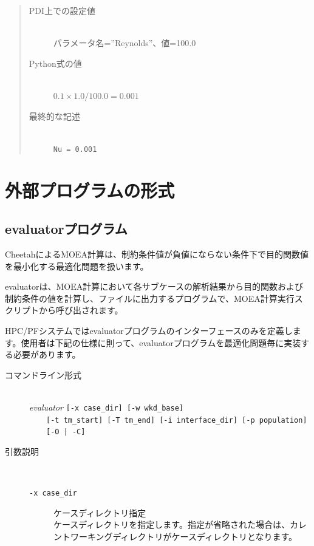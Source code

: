 \documentclass[a4paper,11pt]{jarticle}
\begin{document}
{\begin{quote}
\begin{description}
\item[PDI上での設定値] {\ }\\
パラメータ名=''Reynolds''、値=100.0

\item[Python式の値]  {\ }\\
$0.1 \times 1.0 \slash 100.0 = 0.001$

\item[最終的な記述]  {\ }\\
{\tt Nu = 0.001}
\end{description}
\end{quote}


\newpage
\section{外部プログラムの形式}

\subsection{evaluatorプログラム}

CheetahによるMOEA計算は、制約条件値が負値にならない条件下で目的関数値を最小化する最適化問題を扱います。

evaluatorは、MOEA計算において各サブケースの解析結果から目的関数および制約条件の値を計算し、ファイルに出力するプログラムで、MOEA計算実行スクリプトから呼び出されます。

HPC/PFシステムではevaluatorプログラムのインターフェースのみを定義します。使用者は下記の仕様に則って、evaluatorプログラムを最適化問題毎に実装する必要があります。

\begin{description}
\item[コマンドライン形式] {\ }\\
\textit{evaluator} {\tt [-x case\_dir] [-w wkd\_base]}\\
\ \ \ \ {\tt [-t tm\_start] [-T tm\_end] [-i interface\_dir] [-p population]}\\
\ \ \ \ {\tt [-O | -C]}

\item[引数説明] {\ }\par
\begin{description}
\item[{\tt -x  case\_dir}] ケースディレクトリ指定\\
ケースディレクトリを指定します。指定が省略された場合は、カレントワーキングディレクトリがケースディレクトリとなります。\\


\end{description}
\end{description}}
\end{document}

